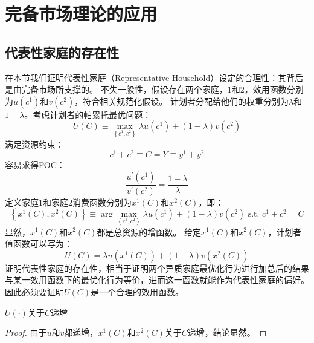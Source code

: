 
\section{完备市场理论的应用}



\subsection{代表性家庭的存在性}    \label{sec-ra-existence}

在本节我们证明代表性家庭（Representative Household）设定的合理性：其背后是由完备市场所支撑的。
不失一般性，假设存在两个家庭，$1$和$2$，效用函数分别为$u\left(c^1\right)$和$v\left(c^2\right)$，符合相关规范化假设。
计划者分配给他们的权重分别为$\lambda$和$1-\lambda$。考虑计划者的帕累托最优问题：
\begin{equation}
    U(C) \equiv \max _{\left\{c^1, c^2\right\}} \lambda u\left(c^1\right)+(1-\lambda) v\left(c^2\right)
\end{equation}
满足资源约束：
\begin{equation}
    c^1+c^2 \equiv C = Y \equiv y^1 + y^2
\end{equation}
容易求得FOC：
\begin{equation}
    \frac{u^{\prime}\left(c^1\right)}{v^{\prime}\left(c^2\right)} = \frac{1-\lambda}{\lambda}
\end{equation}
定义家庭$1$和家庭$2$消费函数分别为$x^1\left(C\right)$和$x^2\left(C\right)$，即：
\begin{equation*}
    \left\{x^1(C), x^2(C)\right\} 
        \equiv \arg\max_{\left\{c^1, c^2\right\}} \lambda u\left(c^1\right)+(1-\lambda) v\left(c^2\right) \text { s.t. } c^1+c^2=C
\end{equation*}
显然，$x^1\left(C\right)$和$x^2\left(C\right)$都是总资源的增函数。
给定$x^1\left(C\right)$和$x^2\left(C\right)$，计划者值函数可以写为：
\begin{equation}    \label{eq-u-h1h2}
    U\left(C\right)=\lambda u\left(x^1\left(C\right)\right)+\left(1-\lambda\right) v\left(x^2\left(C\right)\right)
\end{equation}
证明代表性家庭的存在性，相当于证明两个异质家庭最优化行为进行加总后的结果与某一效用函数下的最优化行为等价，进而这一函数就能作为代表性家庭的偏好。
因此必须要证明$U\left(C\right)$是一个合理的效用函数。
\begin{property}
    $U\left(\cdot\right)$关于$C$递增
\end{property}
\begin{proof}
    由于$u$和$v$都递增，$x^1\left(C\right)$和$x^2\left(C\right)$关于$C$递增，结论显然。
\end{proof}

